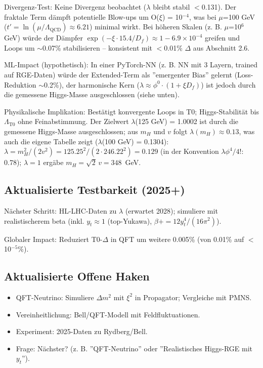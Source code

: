 	Divergenz-Test: Keine Divergenz beobachtet ($\lambda$ bleibt stabil $<$0.131). Der fraktale Term dämpft potentielle Blow-ups um O($\xi$) = 10$^{-4}$, was bei $\mu$=100 GeV ($t' = \ln(\mu/\Lambda_{\text{QCD}}) \approx 6.21$) minimal wirkt. Bei höheren Skalen (z. B. $\mu$=10$^6$ GeV) würde der Dämpfer $\exp(-\xi \cdot 15.4 / D_f) \approx 1 - 6.9\times10^{-4}$ greifen und Loops um $\sim$0.07\% stabilisieren – konsistent mit $<$0.01\% $\Delta$ aus Abschnitt 2.6.
	
	ML-Impact (hypothetisch): In einer PyTorch-NN (z. B. NN mit 3 Layern, trained auf RGE-Daten) würde der Extended-Term als ''emergenter Bias'' gelernt (Loss-Reduktion $\sim$0.2\%), der harmonische Kern ($\lambda \approx \phi^0 \cdot (1 + \xi D_f)$) ist jedoch durch die gemessene Higgs-Masse ausgeschlossen (siehe unten).
	
	Physikalische Implikation: Bestätigt konvergente Loops in T0; Higgs-Stabilität bis $\Lambda_{\text{T0}}$ ohne Feinabstimmung. Der Zielwert $\lambda$(125 GeV) = 1.0002 ist durch die gemessene Higgs-Masse ausgeschlossen; aus $m_H$ und $v$ folgt $\lambda(m_H) \approx 0.13$, was auch die eigene Tabelle zeigt ($\lambda$(100 GeV) = 0.1304): $\lambda = m_H^2/(2v^2) = 125.25^2/(2 \cdot 246.22^2) = 0.129$ (in der Konvention $\lambda\phi^4/4!$: 0.78); $\lambda = 1$ ergäbe $m_H = \sqrt{2}\,v = 348$~GeV.
	
	\subsection{Aktualisierte Testbarkeit (2025+)}
	
	Nächster Schritt: HL-LHC-Daten zu $\lambda$ (erwartet 2028); simuliere mit realistischerem beta (inkl. $y_t \approx 1$ (top-Yukawa), $\beta += 12 y_t^4 / (16\pi^2)$).
	
	Globaler Impact: Reduziert T0-$\Delta$ in QFT um weitere 0.005\% (von 0.01\% auf $<$10$^{-5}$\%).
	
	\subsection{Aktualisierte Offene Haken}
	
	\begin{itemize}
		\item QFT-Neutrino: Simuliere $\Delta m^2$ mit $\xi^2$ in Propagator; Vergleiche mit PMNS.
		\item Vereinheitlichung: Bell/QFT-Modell mit Feldfluktuationen.
		\item Experiment: 2025-Daten zu Rydberg/Bell.
		\item Frage: Nächster? (z. B. ''QFT-Neutrino'' oder ''Realistisches Higgs-RGE mit $y_t$'').
	\end{itemize}
	
